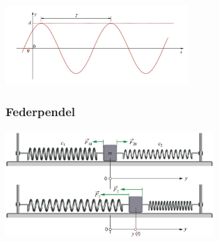\begin{center}
	\begin{minipage}{0.25\textwidth}
		 \\
		
		 \\
		 \\
		 \\
	\end{minipage}%
	\begin{minipage}{0.3\textwidth}
		\includegraphics[height=3cm,keepaspectratio=true]{Images/harmonische_schwingung.png}
	\end{minipage}
\end{center}



\subsubsection{Federpendel}

\begin{center}
	\begin{minipage}{0.2\textwidth}
	\end{minipage}%
	\begin{minipage}{0.3\textwidth}
		\includegraphics[height=4cm,keepaspectratio=true]{Images/federpendel.png}
	\end{minipage}
\end{center}

